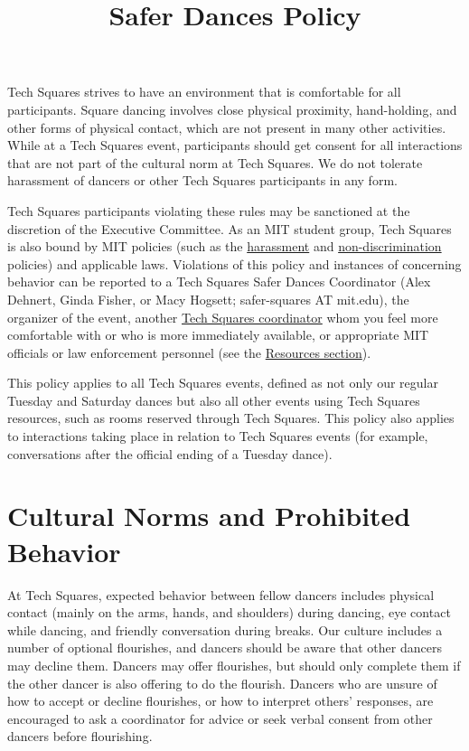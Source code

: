 \documentclass{article}
\title{Safer Dances Policy}
\date{}
\begin{document}
\maketitle

Tech Squares strives to have an environment that is comfortable for all participants. Square dancing involves close physical proximity, hand-holding, and other forms of physical contact, which are not present in many other activities. While at a Tech Squares event, participants should get consent for all interactions that are not part of the cultural norm at Tech Squares. We do not tolerate harassment of dancers or other Tech Squares participants in any form.

Tech Squares participants violating these rules may be sanctioned at the discretion of the Executive Committee. As an MIT student group, Tech Squares is also bound by MIT policies (such as the \href{http://handbook.mit.edu/harassment}{harassment} and \href{http://web.mit.edu/referencepubs/nondiscrimination/}{non-discrimination} policies) and applicable laws. Violations of this policy and instances of concerning behavior can be reported to a Tech Squares Safer Dances Coordinator (Alex Dehnert, Ginda Fisher, or Macy Hogsett; safer-squares AT mit.edu), the organizer of the event, another \href{http://www.mit.edu/\~{}tech-squares/officers.html}{Tech Squares coordinator} whom you feel more comfortable with or who is more immediately available, or appropriate MIT officials or law enforcement personnel (see the \hyperref[sec:resources]{Resources section}).

This policy applies to all Tech Squares events, defined as not only our regular Tuesday and Saturday dances but also all other events using Tech Squares resources, such as rooms reserved through Tech Squares. This policy also applies to interactions taking place in relation to Tech Squares events (for example, conversations after the official ending of a Tuesday dance).

\section{Cultural Norms and Prohibited Behavior}

At Tech Squares, expected behavior between fellow dancers includes physical contact (mainly on the arms, hands, and shoulders) during dancing, eye contact while dancing, and friendly conversation during breaks. Our culture includes a number of optional flourishes, and dancers should be aware that other dancers may decline them. Dancers may offer flourishes, but should only complete them if the other dancer is also offering to do the flourish. Dancers who are unsure of how to accept or decline flourishes, or how to interpret others' responses, are encouraged to ask a coordinator for advice or seek verbal consent from other dancers before flourishing.
\end{document}
